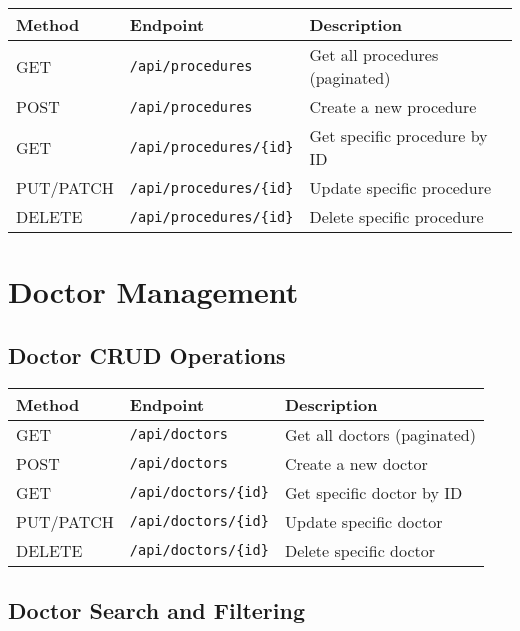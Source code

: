 \documentclass[12pt,a4paper]{article}
\begin{document}
\begin{longtable}{|p{}|p{}|p{}|}
\hline
\textbf{Method} & \textbf{Endpoint} & \textbf{Description} \\
\hline
\endhead

GET & \texttt{/api/procedures} & Get all procedures (paginated) \\
POST & \texttt{/api/procedures} & Create a new procedure \\
GET & \texttt{/api/procedures/\{id\}} & Get specific procedure by ID \\
PUT/PATCH & \texttt{/api/procedures/\{id\}} & Update specific procedure \\
DELETE & \texttt{/api/procedures/\{id\}} & Delete specific procedure \\
\hline
\end{longtable}

\section{Doctor Management}

\subsection{Doctor CRUD Operations}

\begin{longtable}{|p{}|p{}|p{}|}
\hline
\textbf{Method} & \textbf{Endpoint} & \textbf{Description} \\
\hline
\endhead

GET & \texttt{/api/doctors} & Get all doctors (paginated) \\
POST & \texttt{/api/doctors} & Create a new doctor \\
GET & \texttt{/api/doctors/\{id\}} & Get specific doctor by ID \\
PUT/PATCH & \texttt{/api/doctors/\{id\}} & Update specific doctor \\
DELETE & \texttt{/api/doctors/\{id\}} & Delete specific doctor \\
\hline
\end{longtable}

\subsection{Doctor Search and Filtering}
\end{document}
